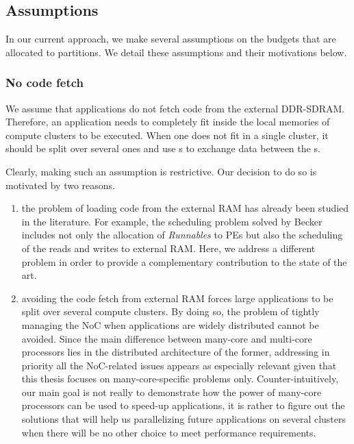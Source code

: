 \documentclass[main.tex]{subfiles}
\begin{document}
\subsection{Assumptions}
In our current approach, we make several assumptions on the budgets that are
allocated to partitions. We detail these assumptions and their motivations
below.
\subsubsection{No code fetch}
We assume that applications do not fetch code from the external DDR-SDRAM.
Therefore, an application needs to completely fit inside the local memories of
compute clusters to be executed. When one does not fit in a single cluster, it
should be split over several ones and use \PC{}s to exchange data between the
\PN{}s. 

Clearly, making such an assumption is restrictive. Our decision to do so is
motivated by two reasons. 
\begin{enumerate}
    \item the problem of loading code from the external RAM has already been
        studied in the literature. For example, the scheduling problem solved
        by Becker \etal~\cite{Becker16} includes not only the allocation of
        \emph{Runnables} to PEs but also the scheduling of the reads and writes
        to external RAM. Here, we address a different problem in order to
        provide a complementary contribution to the state of the art. 

    \item avoiding the code fetch from external RAM forces large applications
        to be split over several compute clusters. By doing so, the problem of
        tightly managing the NoC when applications are widely distributed
        cannot be avoided. Since the main difference between many-core and
        multi-core processors lies in the distributed architecture of the
        former, addressing in priority all the NoC-related issues appears as
        especially relevant given that this thesis focuses on
        many-core-specific problems only. Counter-intuitively, our main goal is
        not really to demonstrate how the power of many-core processors can be
        used to speed-up applications, it is rather to figure out the solutions
        that will help us parallelizing future applications on several clusters
        when there will be no other choice to meet performance requirements.
\end{enumerate}
\end{document}
